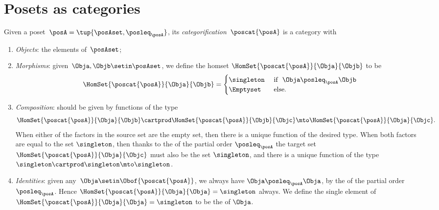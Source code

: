 
\section[Posets as categories]{Posets as categories}
\label{sec:posets-as-cats}

\begin{ctdefinition}\label{def:poscat}
    Given a poset~$\posA = \tup{\posAset, \posleq_\posA}$, its \emph{categorification}~$\poscat{\posA}$ is a category with
    \begin{enumerate}
        \item \emph{Objects}: the elements of~$\posAset$;
        \item \emph{Morphisms}: given~$\Obja,\Objb\setin \posAset$, we define the homset $\HomSet{\poscat{\posA}}{\Obja}{\Objb}$ to be
        \begin{equation}
\HomSet{\poscat{\posA}}{\Obja}{\Objb} = 
\begin{cases}
\singleton & \text{ if }  \ \Obja \posleq_\posA \Objb \\
\Emptyset & \text{ else. }
\end{cases}
\end{equation}
        \item \emph{Composition}: should be given by functions of the type
        \begin{equation}
\HomSet{\poscat{\posA}}{\Obja}{\Objb} \cartprod \HomSet{\poscat{\posA}}{\Objb}{\Objc} \mto \HomSet{\poscat{\posA}}{\Obja}{\Objc}.
\end{equation}
When either of the factors in the source set are the empty set, then there is a unique function of the desired type. When both factors are equal to the set $\singleton$, then thanks to the \emph{} of the partial order $\posleq_\posA$ the target set $\HomSet{\poscat{\posA}}{\Obja}{\Objc}$ must also be the set $\singleton$, and there is a unique function of the type $\singleton \cartprod \singleton \mto \singleton$.
        \item \emph{Identities}: given any~$\Obja \setin \Obof{\poscat{\posA}}$, we always have $\Obja \posleq_\posA \Obja$, by the \emph{} of the partial order $\posleq_\posA$. Hence $\HomSet{\poscat{\posA}}{\Obja}{\Obja} = \singleton$ always. We define the single element of $\HomSet{\poscat{\posA}}{\Obja}{\Obja} = \singleton$ to be the  of $\Obja$. 
    \end{enumerate}
\end{ctdefinition}

